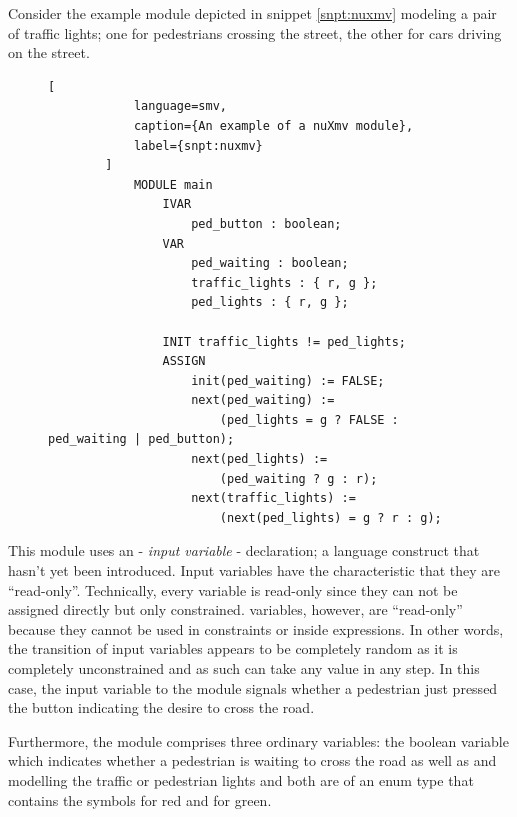 \begin{example}
    Consider the example module depicted in snippet \ref{snpt:nuxmv} modeling a pair of traffic lights; one for pedestrians crossing the street, the other for cars driving on the street.

    \begin{figure}
        \begin{lstlisting}[
            language=smv,
            caption={An example of a nuXmv module},
            label={snpt:nuxmv}
        ]
            MODULE main
                IVAR
                    ped_button : boolean;
                VAR
                    ped_waiting : boolean;
                    traffic_lights : { r, g };
                    ped_lights : { r, g };

                INIT traffic_lights != ped_lights;
                ASSIGN
                    init(ped_waiting) := FALSE;
                    next(ped_waiting) :=
                        (ped_lights = g ? FALSE : ped_waiting | ped_button);
                    next(ped_lights) :=
                        (ped_waiting ? g : r);
                    next(traffic_lights) :=
                        (next(ped_lights) = g ? r : g);
        \end{lstlisting}
    \end{figure}

    This module uses an  - \textit{input variable} - declaration; a language construct that hasn't yet been introduced.
    Input variables have the characteristic that they are \enquote{read-only}.
    Technically, every variable is read-only since they can not be assigned directly but only constrained.
     variables, however, are \enquote{read-only} because they cannot be used in  constraints or inside  expressions.
    In other words, the transition of input variables appears to be completely random as it is completely unconstrained and as such can take any value in any step.
    In this case, the input variable to the module signals whether a pedestrian just pressed the button indicating the desire to cross the road.

    Furthermore, the module comprises three ordinary variables: the boolean variable  which indicates whether a pedestrian is waiting to cross the road as well as  and  modelling the traffic or pedestrian lights and both are of an enum type that contains the symbols  for red and  for green.


\end{example}
